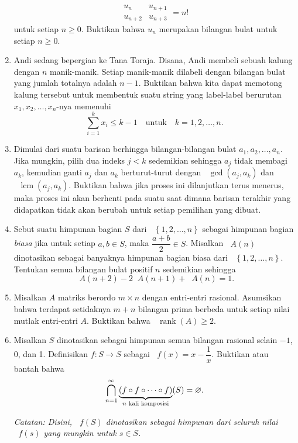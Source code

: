 \documentclass[12pt]{article}
\let\emptyset\varnothing
\newcommand*\lrbr[1]{\mathop{}\!\left\lbrace#1\right\rbrace}
\newcommand*\func[2]{\mathop{}\!{#1}{\left({#2}\right)}}
\newcommand*\ubr[2]{\mathop{}\!\underbrace{#1}_{\text{$ {#2} $}}}
\DeclareMathOperator{\lcm}{lcm}				%
\DeclareMathOperator{\rank}{rank}			%
\begin{document}
\begin{enumerate}[leftmargin=*]
\[{\begin{matrix}
				u_{n} & u_{n + 1} \\
				u_{n + 2} & u_{n + 3}
		\end{matrix}} = n! \]
		untuk setiap $ n \geq 0 $. Buktikan bahwa $ u_{n} $ merupakan bilangan bulat untuk setiap $ n \geq 0 $.
		\item Andi sedang bepergian ke Tana Toraja. Disana, Andi membeli sebuah kalung dengan $ n $ manik-manik. Setiap manik-manik dilabeli dengan bilangan bulat yang jumlah totalnya adalah $ n - 1 $. Buktikan bahwa kita dapat memotong kalung tersebut untuk membentuk suatu string yang label-label berurutan $ x_{1}, x_{2}, \dots, x_{n} $-nya memenuhi
		\[ \sum_{i = 1}^{k}{x_{i}} \leq k - 1 \quad \mbox{untuk} \quad k = 1, 2, \dots, n. \]
		\item Dimulai dari suatu barisan berhingga bilangan-bilangan bulat $ a_{1}, a_{2}, \dots, a_{n} $. Jika mungkin, pilih dua indeks $ j < k $ sedemikian sehingga $ a_{j} $ tidak membagi $ a_{k} $, kemudian ganti $ a_{j} $ dan $ a_{k} $ berturut-turut dengan $ \func{\gcd}{a_{j}, a_{k}} $ dan $ \func{\lcm}{a_{j}, a_{k}} $. Buktikan bahwa jika proses ini dilanjutkan terus menerus, maka proses ini akan berhenti pada suatu saat dimana barisan terakhir yang didapatkan tidak akan berubah untuk setiap pemilihan yang dibuat.
		\item Sebut suatu himpunan bagian $ S $ dari $ \lrbr{1, 2, \dots, n} $ sebagai himpunan bagian \textit{biasa} jika untuk setiap $ a, b \in S $, maka $ \dfrac{a + b}{2} \in S $. Misalkan $ \func{A}{n} $ dinotasikan sebagai banyaknya himpunan bagian biasa dari $ \lrbr{1, 2, \dots, n} $. Tentukan semua bilangan bulat positif $ n $ sedemikian sehingga
		\[ \func{A}{n + 2} - 2\func{A}{n + 1} + \func{A}{n} = 1. \]
		\item Misalkan $ A $ matriks berordo $ m \times n $ dengan entri-entri rasional. Asumsikan bahwa terdapat setidaknya $ m + n $ bilangan prima berbeda untuk setiap nilai mutlak entri-entri $ A $. Buktikan bahwa $ \func{\rank}{A} \geq 2 $.
		\item Misalkan $ S $ dinotasikan sebagai himpunan semua bilangan rasional selain $ -1 $, 0, dan 1. Definisikan $ f : S \to S $ sebagai $ \func{f}{x} = x - \dfrac{1}{x} $. Buktikan atau bantah bahwa
		\[ \bigcap_{n = 1}^{\infty}{\func{\ubr{\left(f \circ f \circ \cdots \circ f\right)}{n \mbox{ kali komposisi}}}{S}} = \emptyset. \]
		\par \noindent \textit{Catatan: Disini, $ \func{f}{S} $ dinotasikan sebagai himpunan dari seluruh nilai $ \func{f}{s} $ yang mungkin untuk $ s \in S $.}

\end{enumerate}
\end{document}
